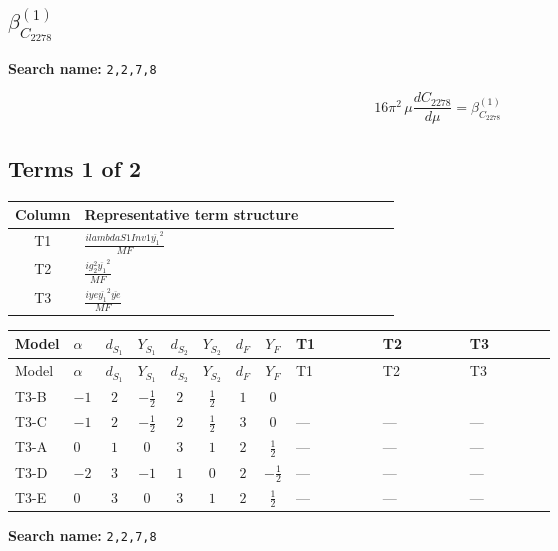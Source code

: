 \documentclass[8pt]{article}
\begin{document}
\begin{landscape}
\section*{$\beta_{C_{2278}}^{(1)}$}
\noindent\textbf{Search name: }\texttt{2,2,7,8}\par\smallskip
\[16\pi^2\,\mu\frac{d C_{2278}}{d\mu}=\beta_{C_{2278}}^{(1)}\]
\subsection*{Terms 1 of 2}
\begin{center}
\begin{tabular}{@{}c >{\raggedright\arraybackslash}p{0.82\linewidth}@{}}
\toprule
Column & Representative term structure \\
\midrule
T1 & \(\displaystyle \frac{i lambdaS1Inv1 \overline{y_{1}}^{2}}{MF}\) \\
\midrule
T2 & \(\displaystyle \frac{i g_{2}^{2} \overline{y_{1}}^{2}}{MF}\) \\
\midrule
T3 & \(\displaystyle \frac{i ye \overline{y_{1}}^{2} \overline{ye}}{MF}\) \\
\midrule
\bottomrule
\end{tabular}
\end{center}
\smallskip
\tiny
\begin{longtable}{@{}llcccccc >{\raggedright\arraybackslash}p{0.21\linewidth} >{\raggedright\arraybackslash}p{0.21\linewidth} >{\raggedright\arraybackslash}p{0.21\linewidth}@{}}
\toprule
Model & $\alpha$ & $d_{S_1}$ & $Y_{S_1}$ & $d_{S_2}$ & $Y_{S_2}$ & $d_F$ & $Y_F$ & T1 & T2 & T3 \\
\midrule
\endfirsthead
\toprule
Model & $\alpha$ & $d_{S_1}$ & $Y_{S_1}$ & $d_{S_2}$ & $Y_{S_2}$ & $d_F$ & $Y_F$ & T1 & T2 & T3 \\
\midrule
\endhead
T3-B & $-1$ & $2$ & $-\frac{1}{2}$ & $2$ & $\frac{1}{2}$ & $1$ & $0$ & \scriptsize\adjustbox{max width=\linewidth}{$\begin{gathered} \frac{i lambdaS1Inv1 \overline{y_{1}}^{2}}{2 MF}\end{gathered}$} & \scriptsize\adjustbox{max width=\linewidth}{$\begin{gathered} \frac{3 i g_{2}^{2} \overline{y_{1}}^{2}}{4 MF}\end{gathered}$} & \scriptsize\adjustbox{max width=\linewidth}{$\begin{gathered} - \frac{i ye \overline{y_{1}}^{2} \overline{ye}}{4 MF}\end{gathered}$} \\
\midrule
T3-C & $-1$ & $2$ & $-\frac{1}{2}$ & $2$ & $\frac{1}{2}$ & $3$ & $0$ & --- & --- & --- \\
\midrule
T3-A & $0$ & $1$ & $0$ & $3$ & $1$ & $2$ & $\frac{1}{2}$ & --- & --- & --- \\
\midrule
T3-D & $-2$ & $3$ & $-1$ & $1$ & $0$ & $2$ & $-\frac{1}{2}$ & --- & --- & --- \\
\midrule
T3-E & $0$ & $3$ & $0$ & $3$ & $1$ & $2$ & $\frac{1}{2}$ & --- & --- & --- \\
\midrule
\bottomrule
\end{longtable}
\clearpage
\noindent\textbf{Search name: }\texttt{2,2,7,8}\par\smallskip

\end{landscape}
\end{document}

